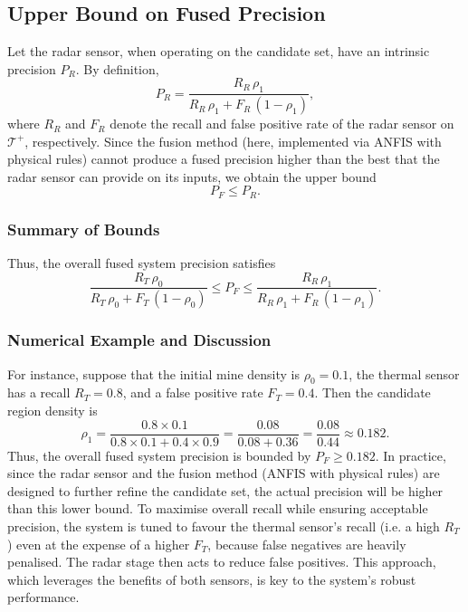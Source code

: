         \subsection*{Upper Bound on Fused Precision}
        Let the radar sensor, when operating on the candidate set, have an intrinsic precision \(P_R\). By definition,
        \[
        P_R = \frac{R_R\,\rho_1}{R_R\,\rho_1 + F_R\,(1-\rho_1)},
        \]
        where \(R_R\) and \(F_R\) denote the recall and false positive rate of the radar sensor on \(\mathcal{T}^+\), respectively. Since the fusion method (here, implemented via ANFIS with physical rules) cannot produce a fused precision higher than the best that the radar sensor can provide on its inputs, we obtain the upper bound
        \[
        P_F \le P_R.
        \]
    
    \subsubsection*{Summary of Bounds}
    
        Thus, the overall fused system precision satisfies
        \[
        \frac{R_T\,\rho_0}{R_T\,\rho_0 + F_T\,(1-\rho_0)} \le P_F \le \frac{R_R\,\rho_1}{R_R\,\rho_1 + F_R\,(1-\rho_1)}.
        \]
        
    \subsubsection*{Numerical Example and Discussion}
    
        For instance, suppose that the initial mine density is \(\rho_0 = 0.1\), the thermal sensor has a recall \(R_T = 0.8\), and a false positive rate \(F_T = 0.4\). Then the candidate region density is
        \[
        \rho_1 = \frac{0.8 \times 0.1}{0.8 \times 0.1 + 0.4 \times 0.9} 
        = \frac{0.08}{0.08 + 0.36} 
        = \frac{0.08}{0.44} \approx 0.182.
        \]
        Thus, the overall fused system precision is bounded by \(P_F \ge 0.182\). In practice, since the radar sensor and the fusion method (ANFIS with physical rules) are designed to further refine the candidate set, the actual precision will be higher than this lower bound. To maximise overall recall while ensuring acceptable precision, the system is tuned to favour the thermal sensor’s recall (i.e. a high \(R_T\)) even at the expense of a higher \(F_T\), because false negatives are heavily penalised. The radar stage then acts to reduce false positives. This approach, which leverages the benefits of both sensors, is key to the system’s robust performance.